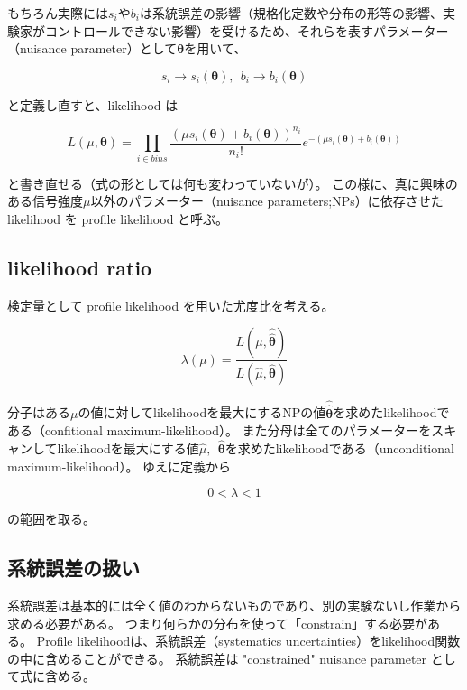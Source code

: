 もちろん実際には$s_i$や$b_i$は系統誤差の影響（規格化定数や分布の形等の影響、実験家がコントロールできない影響）を受けるため、それらを表すパラメーター（nuisance parameter）として$\bm{\theta}$を用いて、

\begin{equation}
s_i \to s_i(\bm{\theta}),~~b_i\to b_i(\bm{\theta})
\end{equation}

と定義し直すと、likelihood は

\begin{equation}
L(\mu,\bm{\theta})=\prod_{i\in bins} \frac{(\mu s_i(\bm{\theta})+b_i(\bm{\theta}))^{n_i}}{n_i!}e^{-(\mu s_i(\bm{\theta})+b_i(\bm{\theta}))}
\end{equation}

と書き直せる（式の形としては何も変わっていないが）。
この様に、真に興味のある信号強度$\mu$以外のパラメーター（nuisance parameters;NPs）に依存させた likelihood を profile likelihood と呼ぶ。

\subsection{likelihood ratio}
検定量として profile likelihood を用いた尤度比を考える。

\begin{equation}
\lambda(\mu)=\frac{L(\mu,\hat{\hat{\bm{\theta}}})}{L(\hat{\mu},\hat{\bm{\theta}})}
\end{equation}

分子はある$\mu$の値に対してlikelihoodを最大にするNPの値$\hat{\hat{\bm{\theta}}}$を求めたlikelihoodである（confitional maximum-likelihood）。
また分母は全てのパラメーターをスキャンしてlikelihoodを最大にする値$\hat{\mu},~~\hat{\bm{\theta}}$を求めたlikelihoodである（unconditional maximum-likelihood）。
ゆえに定義から

\begin{equation}
0 < \lambda < 1
\end{equation}

の範囲を取る。


\subsection{系統誤差の扱い}
系統誤差は基本的には全く値のわからないものであり、別の実験ないし作業から求める必要がある。
つまり何らかの分布を使って「constrain」する必要がある。
Profile likelihoodは、系統誤差（systematics uncertainties）をlikelihood関数の中に含めることができる。
系統誤差は "constrained" nuisance parameter として式に含める。


